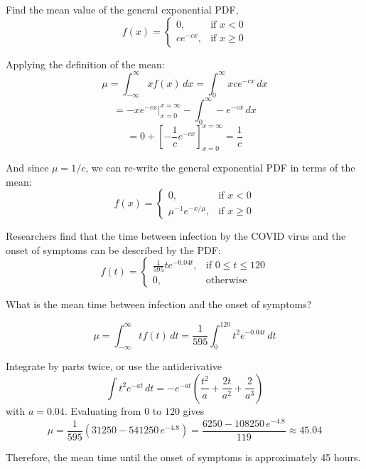 \begin{Worked}
\begin{Problem}
Find the mean value of the general exponential PDF, 
$$f(x) = 
\begin{cases}
0,&\text{if }x < 0\\
ce^{-cx},&\text{if }x \geq 0
\end{cases}$$
\end{Problem}
\begin{Solution}
Applying the definition of the mean:
$$\mu = \int_{-\infty}^{\infty} xf(x)\,dx = \int_0^{\infty} xce^{-cx}\,dx$$
$$= -xe^{-cx}|_{x = 0}^{x = \infty} - \int_0^{\infty} -e^{-cx}\,dx$$
$$= 0 + \left[-\frac{1}{c}e^{-cx} \right]_{x = 0}^{x = \infty} = \frac{1}{c}$$

And since $\mu = 1/c$, we can re-write the general exponential PDF in terms of 
the mean:
$$f(x) = 
\begin{cases}
0,&\text{if }x < 0\\
\mu^{-1}e^{-x/\mu},&\text{if }x \geq 0
\end{cases}$$
\end{Solution}
\end{Worked}

\begin{Exercise}[title = {Onset of Symptoms}, label = symptoms]
Researchers find that the time between infection by the COVID virus and the 
onset of symptoms can be described by the PDF:
$$f(t) = 
\begin{cases}
\frac{1}{595} te^{-0.04t},&\text{if }0 \leq t \leq 120\\
0,&\text{otherwise}
\end{cases}$$

What is the mean time between infection and the onset of symptoms?
\end{Exercise}

\begin{Answer}[ref = symptoms]
$$\mu = \int_{-\infty}^{\infty} tf(t)\,dt = \frac{1}{595} \int_{0}^{120} t^2 e^{-0.04t}\,dt$$

Integrate by parts twice, or use the antiderivative
$$\int t^2 e^{-at}\,dt = -e^{-at}\left(\frac{t^2}{a} + \frac{2t}{a^2} + \frac{2}{a^3}\right)$$
with $a = 0.04$. Evaluating from $0$ to $120$ gives
$$\mu = \frac{1}{595}\left(31250 - 541250\,e^{-4.8}\right) = \frac{6250 - 108250\,e^{-4.8}}{119} \approx 45.04$$

Therefore, the mean time until the onset of symptoms is approximately 45 hours.
\end{Answer}
